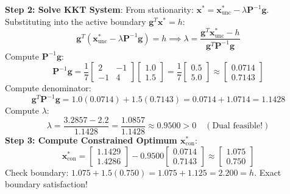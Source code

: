 \documentclass[11pt,a4paper]{article}
\begin{document}
\begin{examplebox}
\textbf{Step 2: Solve KKT System}:
From stationarity: $\mathbf{x}^* = \mathbf{x}^*_{\mathrm{unc}} - \lambda \mathbf{P}^{-1} \mathbf{g}$. Substituting into the active boundary $\mathbf{g}^T \mathbf{x}^* = h$:
\begin{equation*}
\mathbf{g}^T (\mathbf{x}^*_{\mathrm{unc}} - \lambda \mathbf{P}^{-1} \mathbf{g}) = h \implies \lambda = \frac{\mathbf{g}^T \mathbf{x}^*_{\mathrm{unc}} - h}{\mathbf{g}^T \mathbf{P}^{-1} \mathbf{g}}
\end{equation*}
Compute $\mathbf{P}^{-1} \mathbf{g}$:
\begin{equation*}
\mathbf{P}^{-1} \mathbf{g} = \frac{1}{7} \begin{bmatrix} 2 & -1 \\ -1 & 4 \end{bmatrix} \begin{bmatrix} 1.0 \\ 1.5 \end{bmatrix} = \frac{1}{7} \begin{bmatrix} 0.5 \\ 5.0 \end{bmatrix} \approx \begin{bmatrix} 0.0714 \\ 0.7143 \end{bmatrix}
\end{equation*}
Compute denominator:
\begin{equation*}
\mathbf{g}^T \mathbf{P}^{-1} \mathbf{g} = 1.0(0.0714) + 1.5(0.7143) = 0.0714 + 1.0714 = 1.1428
\end{equation*}
Compute $\lambda$:
\begin{equation*}
\lambda = \frac{3.2857 - 2.2}{1.1428} = \frac{1.0857}{1.1428} \approx 0.9500 > 0 \quad (\text{Dual feasible!})
\end{equation*}
\textbf{Step 3: Compute Constrained Optimum $\mathbf{x}^*_{\mathrm{con}}$}:
\begin{equation*}
\mathbf{x}^*_{\mathrm{con}} = \begin{bmatrix} 1.1429 \\ 1.4286 \end{bmatrix} - 0.9500 \begin{bmatrix} 0.0714 \\ 0.7143 \end{bmatrix} \approx \begin{bmatrix} 1.075 \\ 0.750 \end{bmatrix}
\end{equation*}
Check boundary: $1.075 + 1.5(0.750) = 1.075 + 1.125 = 2.200 = h$. Exact boundary satisfaction!
\end{examplebox}
\end{document}
